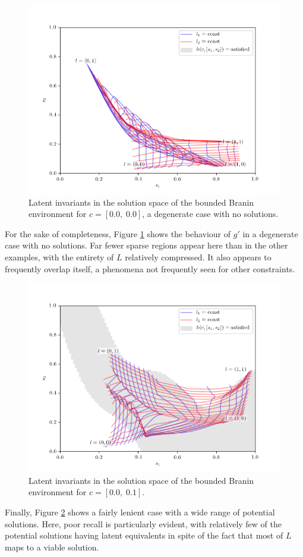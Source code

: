 \documentclass[../../main.tex]{subfiles}
\begin{document}
\begin{figure}[H]
    \begin{center}
    \includegraphics[width=\textwidth]{latentPlot0000}
    \caption[Latent Branin invariants for a degenerate case]{
        Latent invariants in the solution space of the bounded Branin environment for $c=[0.0,\;0.0]$, a degenerate case with no solutions.
    }
    \label{fig:latentPlot0000}
    \end{center}
\end{figure}
For the sake of completeness, Figure \ref{fig:latentPlot0000} shows the behaviour of $g'$ in a degenerate case with no solutions.
Far fewer sparse regions appear here than in the other examples, with the entirety of $L$ relatively compressed.
It also appears to frequently overlap itself, a phenomena not frequently seen for other constraints.
\begin{figure}[H]
    \begin{center}
    \includegraphics[width=\textwidth]{latentPlot0001}
    \caption[Latent Branin invariants for $c={[0.0,\;0.1]}$]{
        Latent invariants in the solution space of the bounded Branin environment for $c=[0.0,\;0.1]$.
    }
    \label{fig:latentPlot0001}
    \end{center}
\end{figure}
Finally, Figure \ref{fig:latentPlot0001} shows a fairly lenient case with a wide range of potential solutions.
Here, poor recall is particularly evident, with relatively few of the potential solutions having latent equivalents in spite of the fact that most of $L$ maps to a viable solution.
\end{document}
